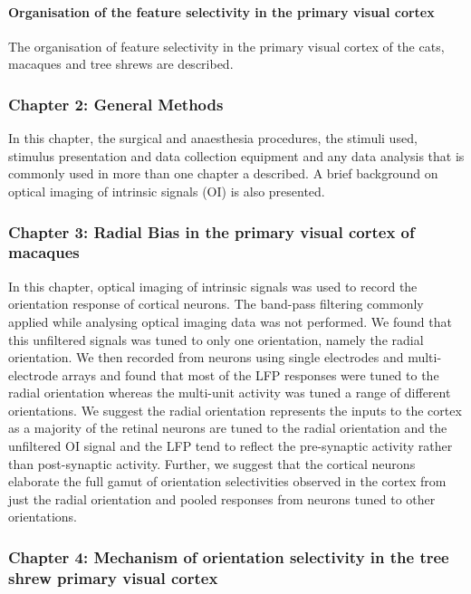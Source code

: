 \documentclass [12] {report}
\begin{document}
	\paragraph{Organisation of the feature selectivity in the primary visual cortex}
	The organisation of feature selectivity in the primary visual cortex of the cats, macaques and tree shrews are described.
	
	\subsubsection{Chapter 2: General Methods}
	
	In this chapter, the surgical and anaesthesia procedures, the stimuli used, stimulus presentation and data collection equipment and any data analysis that is commonly used in more than one chapter a described. A brief background on optical imaging of intrinsic signals (OI) is also presented.
	
	\subsubsection{Chapter 3: Radial Bias in the primary visual cortex of macaques}
	
	In this chapter, optical imaging of intrinsic signals was used to record the orientation response of cortical neurons. The band-pass filtering commonly applied while analysing optical imaging data was not performed. We found that this unfiltered signals was tuned to only one orientation, namely the radial orientation. We then recorded from neurons using single electrodes and multi-electrode arrays and found that most of the LFP responses were tuned to the radial orientation whereas the multi-unit activity was tuned a range of different orientations. We suggest the radial orientation represents the inputs to the cortex as a majority of the retinal neurons are tuned to the radial orientation and the unfiltered OI signal and the LFP tend to reflect the pre-synaptic activity rather than post-synaptic activity. Further, we suggest that the cortical neurons elaborate the full gamut of orientation selectivities observed in the cortex from just the radial orientation and pooled responses from neurons tuned to other orientations.
	
	\subsubsection{Chapter 4: Mechanism of orientation selectivity in the tree shrew primary visual cortex}
	
\end{document}
